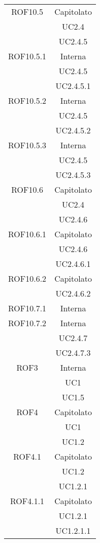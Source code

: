\begin{longtable}{|c|c|}
\midrule
ROF10.5
& Capitolato\\
& UC2.4\\
& UC2.4.5\\

\midrule
ROF10.5.1
& Interna\\
& UC2.4.5\\
& UC2.4.5.1\\

\midrule
ROF10.5.2
& Interna\\
& UC2.4.5\\
& UC2.4.5.2\\

\midrule
ROF10.5.3
& Interna\\
& UC2.4.5\\
& UC2.4.5.3\\

\midrule
ROF10.6
& Capitolato\\
& UC2.4\\
& UC2.4.6\\

\midrule
ROF10.6.1
& Capitolato\\
& UC2.4.6\\
& UC2.4.6.1\\

\midrule
ROF10.6.2
& Capitolato\\
& UC2.4.6.2\\

\midrule
ROF10.7.1
& Interna\\

\midrule
ROF10.7.2
& Interna\\
& UC2.4.7\\
& UC2.4.7.3\\

\midrule
ROF3
& Interna\\
& UC1\\
& UC1.5\\

\midrule
ROF4
& Capitolato\\
& UC1\\
& UC1.2\\

\midrule
ROF4.1
& Capitolato\\
& UC1.2\\
& UC1.2.1\\

\midrule
ROF4.1.1
& Capitolato\\
& UC1.2.1\\
& UC1.2.1.1\\


\end{longtable}
